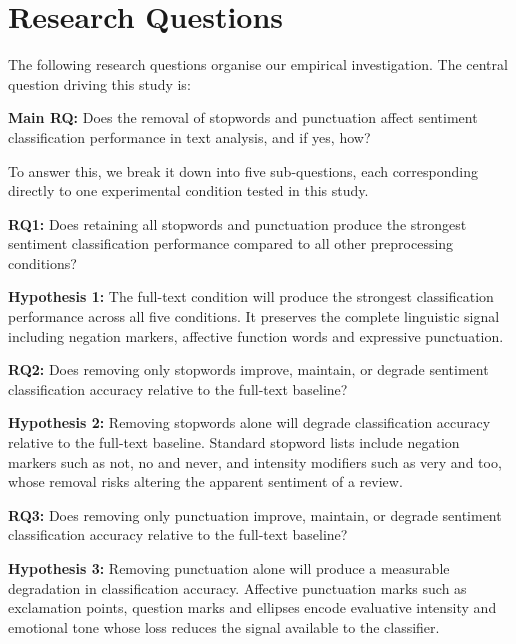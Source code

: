 \documentclass[a4paper,10pt]{article}
\begin{document}
\section{Research Questions}

\noindent The following research questions organise our empirical investigation. The central question driving this study is:

\medskip

\noindent\textbf{Main RQ:} Does the removal of stopwords and punctuation affect sentiment classification performance in text analysis, and if yes, how?

\noindent To answer this, we break it down into five sub-questions, each corresponding directly to one experimental condition tested in this study.

\medskip

\noindent\textbf{RQ1:} Does retaining all stopwords and punctuation produce the strongest sentiment classification performance compared to all other preprocessing conditions?

\noindent\textbf{Hypothesis 1:} The full-text condition will produce the strongest classification performance across all five conditions. It preserves the complete linguistic signal including negation markers, affective function words and expressive punctuation.

\medskip

\noindent\textbf{RQ2:} Does removing only stopwords improve, maintain, or degrade sentiment classification accuracy relative to the full-text baseline?

\noindent\textbf{Hypothesis 2:} Removing stopwords alone will degrade classification accuracy relative to the full-text baseline. Standard stopword lists include negation markers such as not, no and never, and intensity modifiers such as very and too, whose removal risks altering the apparent sentiment of a review.

\medskip

\noindent\textbf{RQ3:} Does removing only punctuation improve, maintain, or degrade sentiment classification accuracy relative to the full-text baseline?

\noindent\textbf{Hypothesis 3:} Removing punctuation alone will produce a measurable degradation in classification accuracy. Affective punctuation marks such as exclamation points, question marks and ellipses encode evaluative intensity and emotional tone whose loss reduces the signal available to the classifier.
\end{document}
